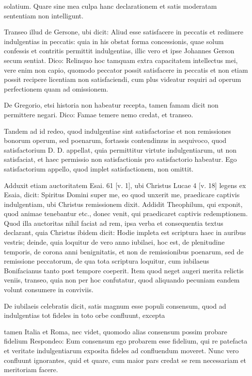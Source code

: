 solatium. Quare sine mea culpa hanc declarationem et satis moderatam sententiam non intelligunt.

Transeo illud de Gersone, ubi dicit: Aliud esse satisfacere in peccatis et redimere indulgentias in peccatis: quia in his obstat forma concessionis, quae solum confessis et contritis permittit indulgentias, illic vero et ipse Johannes Gerson secum sentiat. Dico: Relinquo hoc tamquam extra capacitatem intellectus mei, vere enim non capio, quomodo peccator possit satisfacere in peccatis et non etiam possit recipere licentiam non satisfaciendi, cum plus videatur requiri ad operum perfectionem quam ad omissionem.

\marginpar{\small[356]} De Gregorio, etsi historia non habeatur recepta, tamen famam dicit non permittere negari. Dico: Famae temere nemo credat, et transeo.

Tandem ad id redeo, quod indulgentiae sint satisfactoriae et non remissiones bonorum operum, sed poenarum, fortassis contendimus in aequivoco, quod satisfactorium D. D. appellat, quia permittitur virtute indulgentiarum, ut non satisfaciat, et haec permissio non satisfactionis pro satisfactorio habeatur. Ego satisfactorium appello, quod implet satisfactionem, non omittit.

Adduxit etiam auctoritatem Esai. 61 [v. 1], ubi Christus Lucae 4 [v. 18] legens ex Esaia, dicit: Spiritus Domini super me, eo quod unxerit me, praedicare captivis indulgentiam, ubi Christus remissionem dixit. Addidit Theophilum, qui exponit, quod animae tenebantur etc., donec venit, qui praedicaret captivis redemptionem. Quod illa auctoritas nihil faciat ad rem, ipsa verba et consequentia textus declarant, quia Christus ibidem dicit: Hodie impleta est scriptura haec in auribus vestris; deinde, quia loquitur de vero anno iubilaei, hoc est, de plenitudine temporis, de corona anni benignitatis, et non de remissionibus poenarum, sed de remissione peccatorum, de qua tota scriptura loquitur, cum iubilaeus Bonifacianus tanto post tempore coeperit. Item quod neget augeri merita relictis veniis, transeo, quia non per hoc confutatur, quod aliquando pecuniam eandem volunt consumere in conviviis.

De iubilaeis celebratis dicit, satis magnum esse populi consensum, quod ad indulgentias tot fideles in toto orbe confluunt, excepta

tamen Italia et Roma, nec videt, quomodo alias consensum possim probare fidelium Respondeo: Eum consensum ego probarem esse fidelium, qui re patefacta et veritate indulgentiarum exposita fideles ad confluendum moveret. Nunc vero confluunt ignorantes, quid et quare, cum maior pars credat se rem necessariam et meritoriam facere.

